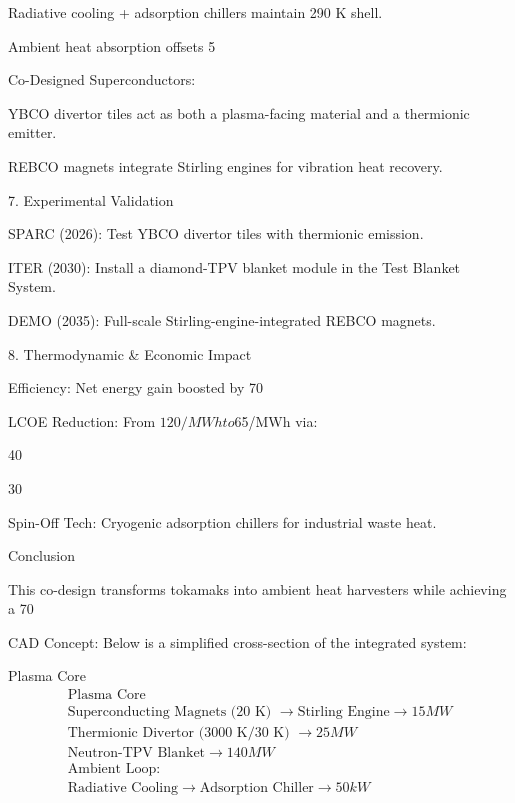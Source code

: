 \documentclass{article}%
\begin{document}
        Radiative cooling + adsorption chillers maintain 290 K shell.

        Ambient heat absorption offsets 5%

    Co-Designed Superconductors:

        YBCO divertor tiles act as both a plasma-facing material and a thermionic emitter.

        REBCO magnets integrate Stirling engines for vibration heat recovery.

7. Experimental Validation

    SPARC (2026): Test YBCO divertor tiles with thermionic emission.

    ITER (2030): Install a diamond-TPV blanket module in the Test Blanket System.

    DEMO (2035): Full-scale Stirling-engine-integrated REBCO magnets.

8. Thermodynamic & Economic Impact

    Efficiency: Net energy gain boosted by 70%

    LCOE Reduction: From $120/MWh to $65/MWh via:

        40%

        30%

    Spin-Off Tech: Cryogenic adsorption chillers for industrial waste heat.

Conclusion

This co-design transforms tokamaks into ambient heat harvesters while achieving a 70%

CAD Concept: Below is a simplified cross-section of the integrated system:

Plasma Core
$$
\begin{array}{c}
\text{Plasma Core} \\
\hline
\text{Superconducting Magnets (20 K) } \rightarrow \text{Stirling Engine} \rightarrow 
15 MW \\
\text{Thermionic Divertor (3000 K/30 K) } \rightarrow 25 MW \\
\text{Neutron-TPV Blanket} \rightarrow 140 MW \\
\text{Ambient Loop: } \\
\text{Radiative Cooling} \rightarrow \text{Adsorption Chiller} \rightarrow 50 kW
\end{array}
$$
\end{document}
